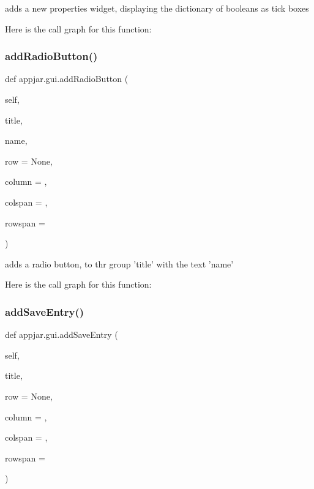 \begin{DoxyVerb}adds a new properties widget, displaying the dictionary of booleans as tick boxes \end{DoxyVerb}
 Here is the call graph for this function\+:
\mbox{\label{classappjar_1_1gui_a43740305a4b98237f344c3228d593467}} 
\subsubsection{\texorpdfstring{add\+Radio\+Button()}{addRadioButton()}}
{\footnotesize\ttfamily def appjar.\+gui.\+add\+Radio\+Button (\begin{DoxyParamCaption}\item[{}]{self,  }\item[{}]{title,  }\item[{}]{name,  }\item[{}]{row = {\ttfamily None},  }\item[{}]{column = {},  }\item[{}]{colspan = {},  }\item[{}]{rowspan = {} }\end{DoxyParamCaption})}

\begin{DoxyVerb}adds a radio button, to thr group 'title' with the text 'name' \end{DoxyVerb}
 Here is the call graph for this function\+:
\mbox{\label{classappjar_1_1gui_a1cafce795a988b38ff98b78e5def5dfb}} 
\subsubsection{\texorpdfstring{add\+Save\+Entry()}{addSaveEntry()}}
{\footnotesize\ttfamily def appjar.\+gui.\+add\+Save\+Entry (\begin{DoxyParamCaption}\item[{}]{self,  }\item[{}]{title,  }\item[{}]{row = {\ttfamily None},  }\item[{}]{column = {},  }\item[{}]{colspan = {},  }\item[{}]{rowspan = {} }\end{DoxyParamCaption})}

